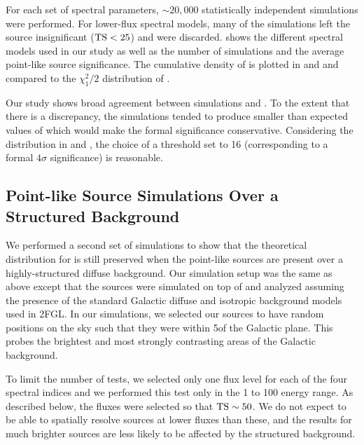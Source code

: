 

For each set of spectral parameters, $\sim20,000$ statistically independent
simulations were performed. For lower-flux spectral models, many of the
simulations left the source insignificant ($\mathrm{TS}<25$)
and were discarded.  
shows the different spectral models used in our study as well as the
number of simulations and the average point-like source
significance.  The cumulative density of \tsext is plotted in
 and  
and compared to the $\chi^2_1/2$ distribution of
.

Our study shows broad agreement between simulations and
. To the extent that there is
a discrepancy, the simulations tended to produce smaller than expected
values of \tsext which would make the formal significance conservative.
Considering the distribution in  and
, the choice of a threshold \tsext set to 16
(corresponding to a formal $4\sigma$ significance) is reasonable.


\subsection{Point-like Source Simulations Over a Structured Background}

We performed a second set of simulations to show that the theoretical distribution
for \tsext is still preserved when the point-like sources are present over
a highly-structured diffuse background.
Our simulation setup was the same as above except that the sources were
simulated on top of and analyzed assuming the presence of the standard
Galactic diffuse and isotropic background models used in 2FGL.  In our
simulations, we selected our sources to have random positions on the sky
such that they were within 5\degree of the Galactic plane. This probes the 
brightest and most strongly contrasting areas of the Galactic background.

To limit the number of tests, we selected only one flux
level for each of the four spectral indices and we performed
this test only in the 1 \gev to 100 \gev energy range. 
As described below, the fluxes were selected so that $\mathrm{TS}\sim50$. We do not
expect to be able to spatially resolve sources 
at lower fluxes than these, and the results for much brighter sources
are less likely to be affected by the 
structured background.

